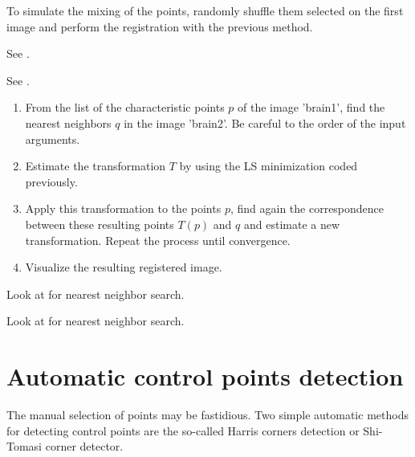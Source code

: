 \begin{qbox}
To simulate the mixing of the points, randomly shuffle them selected on the first image and perform the registration with the previous method.
\end{qbox}

\begin{mcomment}
\begin{mremark}
See . 
\end{mremark}
\end{mcomment}

\begin{pcomment}
\begin{premark}
 See .
\end{premark}
\end{pcomment}


\begin{qbox}
\begin{enumerate}

	\item From the list of the characteristic points $p$ of the image 'brain1', find the nearest neighbors $q$ in the image 'brain2'. Be careful to the order of the input arguments.
	\item Estimate the transformation $T$ by using the LS minimization coded previously.
	\item Apply this transformation to the points $p$, find again the correspondence between these resulting points $T(p)$ and $q$ and estimate a new transformation. Repeat the process until convergence.
	\item Visualize the resulting registered image.
\end{enumerate}
\end{qbox}

\begin{mcomment}
\begin{mremark}
 Look at  for nearest neighbor search.
\end{mremark}
\end{mcomment}

\begin{pcomment}
\begin{premark}
 Look at  for nearest neighbor search.
\end{premark}
\end{pcomment}


\section{Automatic control points detection}
The manual selection of points may be fastidious. Two simple automatic methods for detecting control points are the so-called Harris corners detection or Shi-Tomasi corner detector. 


